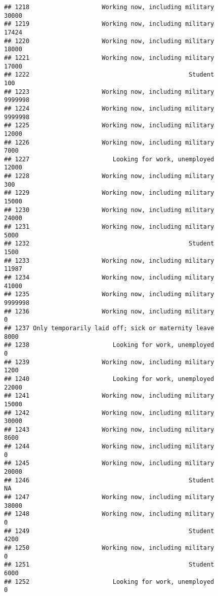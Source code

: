 \documentclass[]{book}
\theoremstyle{definition}
\theoremstyle{definition}
\theoremstyle{remark}
\begin{document}
\begin{verbatim}
## 1218                    Working now, including military           30000
## 1219                    Working now, including military           17424
## 1220                    Working now, including military           18000
## 1221                    Working now, including military           17000
## 1222                                            Student             100
## 1223                    Working now, including military         9999998
## 1224                    Working now, including military         9999998
## 1225                    Working now, including military           12000
## 1226                    Working now, including military            7000
## 1227                       Looking for work, unemployed           12000
## 1228                    Working now, including military             300
## 1229                    Working now, including military           15000
## 1230                    Working now, including military           24000
## 1231                    Working now, including military            5000
## 1232                                            Student            1500
## 1233                    Working now, including military           11987
## 1234                    Working now, including military           41000
## 1235                    Working now, including military         9999998
## 1236                    Working now, including military               0
## 1237 Only temporarily laid off; sick or maternity leave            8000
## 1238                       Looking for work, unemployed               0
## 1239                    Working now, including military            1200
## 1240                       Looking for work, unemployed           22000
## 1241                    Working now, including military           15000
## 1242                    Working now, including military           30000
## 1243                    Working now, including military            8600
## 1244                    Working now, including military               0
## 1245                    Working now, including military           20000
## 1246                                            Student              NA
## 1247                    Working now, including military           38000
## 1248                    Working now, including military               0
## 1249                                            Student            4200
## 1250                    Working now, including military               0
## 1251                                            Student            6000
## 1252                       Looking for work, unemployed               0

\end{verbatim}
\end{document}
